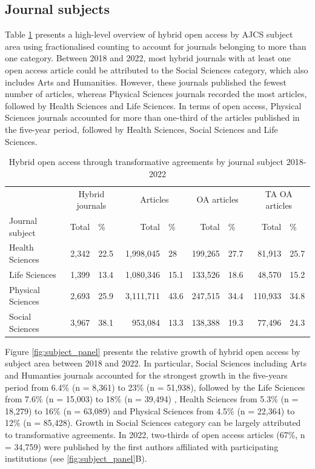\documentclass[a4paper,man,floatsintext,longtable,noextraspace,12pt]{apa6}
\begin{document}
\hypertarget{journal-subjects}{%
\subsection{Journal subjects}\label{journal-subjects}}

Table \ref{tab:subject_summary_table} presents a high-level overview of
hybrid open access by AJCS subject area using fractionalised counting to
account for journals belonging to more than one category. Between 2018
and 2022, most hybrid journals with at least one open access article
could be attributed to the Social Sciences category, which also includes
Arts and Humanities. However, these journals published the fewest number
of articles, whereas Physical Sciences journals recorded the most
articles, followed by Health Sciences and Life Sciences. In terms of
open access, Physical Sciences journals accounted for more than
one-third of the articles published in the five-year period, followed by
Health Sciences, Social Sciences and Life Sciences.

\begin{table}[H]

\caption{\label{tab:subject_summary_table}Hybrid open access through transformative agreements by journal subject 2018-2022}
\centering
\begin{tabular}[t]{lrlrlrlrl}
\toprule
\multicolumn{1}{c}{ } & \multicolumn{2}{c}{Hybrid journals} & \multicolumn{2}{c}{Articles} & \multicolumn{2}{c}{OA articles} & \multicolumn{2}{c}{TA OA articles} \\
\cmidrule(l{3pt}r{3pt}){2-3} \cmidrule(l{3pt}r{3pt}){4-5} \cmidrule(l{3pt}r{3pt}){6-7} \cmidrule(l{3pt}r{3pt}){8-9}
Journal subject & Total & \% & Total & \% & Total & \% & Total & \%\\
\midrule
Health Sciences & 2,342 & 22.5 & 1,998,045 & 28 & 199,265 & 27.7 & 81,913 & 25.7\\
Life Sciences & 1,399 & 13.4 & 1,080,346 & 15.1 & 133,526 & 18.6 & 48,570 & 15.2\\
Physical Sciences & 2,693 & 25.9 & 3,111,711 & 43.6 & 247,515 & 34.4 & 110,933 & 34.8\\
Social Sciences & 3,967 & 38.1 & 953,084 & 13.3 & 138,388 & 19.3 & 77,496 & 24.3\\
\bottomrule
\end{tabular}
\end{table}

Figure \ref{fig:subject_panel} presents the relative growth of hybrid
open access by subject area between 2018 and 2022. In particular, Social
Sciences including Arts and Humanties journals accounted for the
strongest growth in the five-years period from 6.4\% (n = 8,361) to 23\%
(n = 51,938), followed by the Life Sciences from 7.6\% (n = 15,003) to
18\% (n = 39,494) , Health Sciences from 5.3\% (n = 18,279) to 16\% (n =
63,089) and Physical Sciences from 4.5\% (n = 22,364) to 12\% (n =
85,428). Growth in Social Sciences category can be largely attributed to
transformative agreements. In 2022, two-thirds of open access articles
(67\%, n = 34,759) were published by the first authors affiliated with
participating institutions (see \ref{fig:subject_panel}B).
\end{document}
